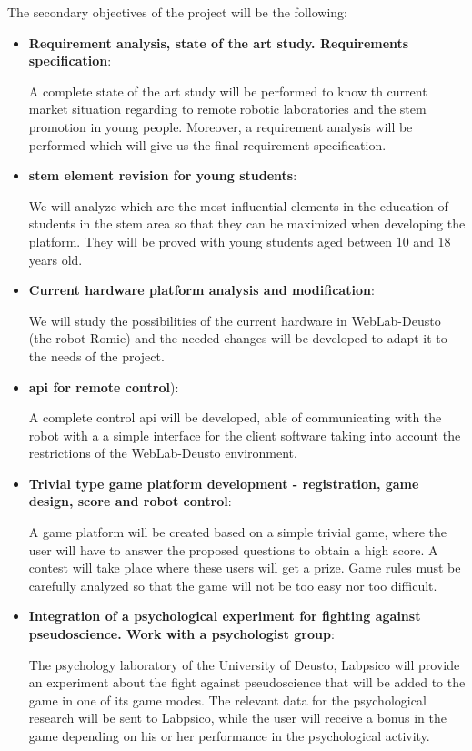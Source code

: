 The secondary objectives of the project will be the following:
\begin{itemize}
\item \textbf{Requirement analysis, state of the art study. Requirements specification}:

A complete state of the art study will be performed to know th current market situation regarding to
remote robotic laboratories and the \acrshort{stem} promotion in young people. Moreover, a
requirement analysis will be performed which will give us the final requirement specification.

\item \textbf{\acrshort{stem} element revision for young students}:

We will analyze which are the most influential elements in the education of students in the
\acrshort{stem} area so that they can be maximized when developing the platform. They will be proved
with young students aged between 10 and 18 years old.

\item \textbf{Current hardware platform analysis and modification}:

We will study the possibilities of the current hardware in WebLab-Deusto (the robot Romie) and the
needed changes will be developed to adapt it to the needs of the project.

\item \textbf{\acrshort{api} for remote control}):

A complete control \acrshort{api} will be developed, able of communicating with the robot with a
a simple interface for the client software taking into account the restrictions of the WebLab-Deusto
environment.

\item \textbf{Trivial type game platform development - registration, game design, score and robot
control}:

A game platform will be created based on a simple trivial game, where the user will have to answer
the proposed questions to obtain a high score. A contest will take place where these users will get
a prize. Game rules must be carefully analyzed so that the game will not be too easy nor too
difficult.

\item \textbf{Integration of a psychological experiment for fighting against pseudoscience. Work
with a psychologist group}:

The psychology laboratory of the University of Deusto, Labpsico will provide an experiment about the
fight against pseudoscience that will be added to the game in one of its game modes. The relevant
data for the psychological research will be sent to Labpsico, while the user will receive a bonus in
the game depending on his or her performance in the psychological activity.


\end{itemize}
